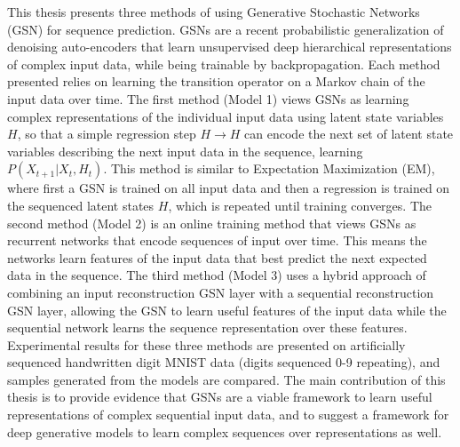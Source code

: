 This thesis presents three methods of using Generative Stochastic Networks (GSN) for sequence prediction. GSNs are a recent probabilistic generalization of denoising auto-encoders that learn unsupervised deep hierarchical representations of complex input data, while being trainable by backpropagation. Each method presented relies on learning the transition operator on a Markov chain of the input data over time. The first method (Model 1) views GSNs as learning complex representations of the individual input data using latent state variables \(H\), so that a simple regression step \(H \rightarrow H\) can encode the next set of latent state variables describing the next input data in the sequence, learning \(P(X_{t+1}|X_t, H_t)\). This method is similar to Expectation Maximization (EM), where first a GSN is trained on all input data and then a regression is trained on the sequenced latent states \(H\), which is repeated until training converges. The second method (Model 2) is an online training method that views GSNs as recurrent networks that encode sequences of input over time. This means the networks learn features of the input data that best predict the next expected data in the sequence. The third method (Model 3) uses a hybrid approach of combining an input reconstruction GSN layer with a sequential reconstruction GSN layer, allowing the GSN to learn useful features of the input data while the sequential network learns the sequence representation over these features. Experimental results for these three methods are presented on artificially sequenced handwritten digit MNIST data (digits sequenced 0-9 repeating), and samples generated from the models are compared. The main contribution of this thesis is to provide evidence that GSNs are a viable framework to learn useful representations of complex sequential input data, and to suggest a framework for deep generative models to learn complex sequences over representations as well.